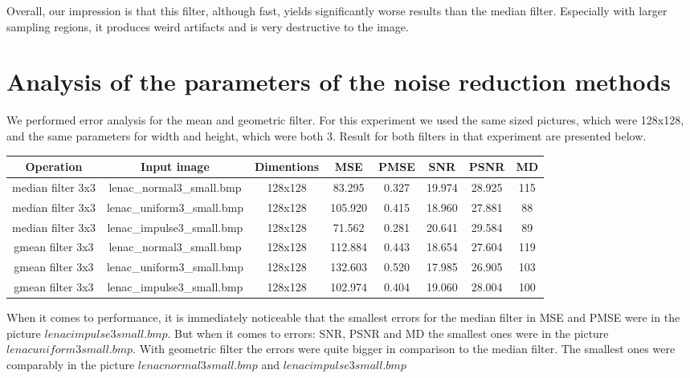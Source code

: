 \documentclass[12pt]{article}
\theoremstyle{definition}
\begin{document}
Overall, our impression is that this filter, although fast, yields significantly worse results than the median filter. 
Especially with larger sampling regions, it produces weird artifacts and is very destructive to the image.

\section{Analysis of the parameters of the noise reduction methods}

We performed error analysis for the mean and geometric filter.
For this experiment we used the same sized pictures, which were 128x128, and the same parameters for width and height, which were both 3. Result for both filters in that experiment are presented below.

\begin{table}[H]
\hskip-1.5cm
\begin{tabular}{cccccccc}
\hline
\textbf{Operation} & \textbf{Input image} & \textbf{Dimentions} & \textbf{MSE} & \textbf{PMSE} & \textbf{SNR} & \textbf{PSNR} & \textbf{MD} \\ \hline
median filter 3x3 & lenac\_normal3\_small.bmp  & 128x128 & 83.295  & 0.327 & 19.974 & 28.925 & 115 \\
median filter 3x3 & lenac\_uniform3\_small.bmp & 128x128 & 105.920 & 0.415 & 18.960 & 27.881 & 88  \\
median filter 3x3 & lenac\_impulse3\_small.bmp & 128x128 & 71.562  & 0.281 & 20.641 & 29.584 & 89  \\
gmean filter 3x3  & lenac\_normal3\_small.bmp  & 128x128 & 112.884 & 0.443 & 18.654 & 27.604 & 119 \\
gmean filter 3x3  & lenac\_uniform3\_small.bmp & 128x128 & 132.603 & 0.520 & 17.985 & 26.905 & 103 \\
gmean filter 3x3  & lenac\_impulse3\_small.bmp & 128x128 & 102.974 & 0.404 & 19.060 & 28.004 & 100 \\ \hline
\end{tabular}
\end{table}

When it comes to performance, it is immediately noticeable that the smallest errors for the median filter in MSE and PMSE were in the picture $lenac impulse3 small.bmp$. But when it comes to errors: SNR, PSNR and MD the smallest ones were in the picture $lenac uniform3 small.bmp$. With geometric filter the errors were quite bigger in comparison to the median filter. The smallest ones were comparably in the picture $lenac normal3 small.bmp$ and $lenac impulse3 small.bmp$
\end{document}
